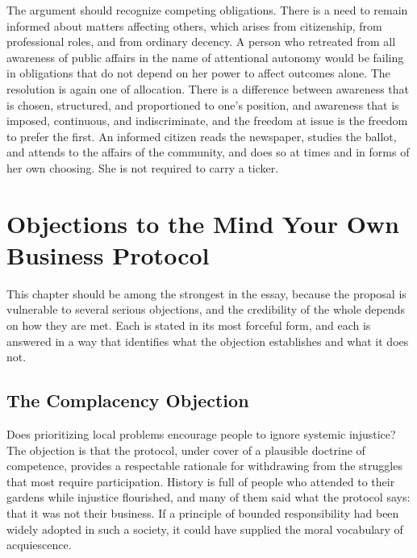 \documentclass[11pt]{report}
\theoremstyle{definition}
\theoremstyle{remark}
\begin{document}
The argument should recognize competing obligations. There is a need to remain informed about matters affecting others, which arises from citizenship, from professional roles, and from ordinary decency. A person who retreated from all awareness of public affairs in the name of attentional autonomy would be failing in obligations that do not depend on her power to affect outcomes alone. The resolution is again one of allocation. There is a difference between awareness that is chosen, structured, and proportioned to one's position, and awareness that is imposed, continuous, and indiscriminate, and the freedom at issue is the freedom to prefer the first. An informed citizen reads the newspaper, studies the ballot, and attends to the affairs of the community, and does so at times and in forms of her own choosing. She is not required to carry a ticker.

\chapter{Objections to the Mind Your Own Business Protocol}

This chapter should be among the strongest in the essay, because the proposal is vulnerable to several serious objections, and the credibility of the whole depends on how they are met. Each is stated in its most forceful form, and each is answered in a way that identifies what the objection establishes and what it does not.

\section{The Complacency Objection}

Does prioritizing local problems encourage people to ignore systemic injustice? The objection is that the protocol, under cover of a plausible doctrine of competence, provides a respectable rationale for withdrawing from the struggles that most require participation. History is full of people who attended to their gardens while injustice flourished, and many of them said what the protocol says: that it was not their business. If a principle of bounded responsibility had been widely adopted in such a society, it could have supplied the moral vocabulary of acquiescence.
\end{document}
